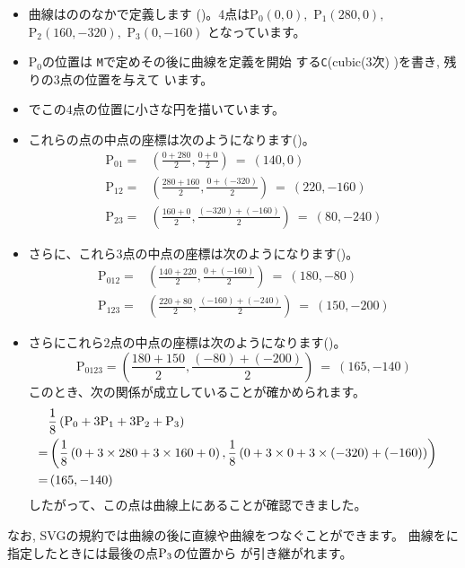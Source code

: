 \iffalse
なお、制御点をインターラクテイブに操作できるSVGの例が付録
\ref{svg-Bezier-interactive}
にありますので参考にしてください。
\fi
{}
\begin{itemize}
 \item \Bezier 曲線はののなかで定義します
       ()。4点は$
	\mathrm{P}_0(0,0),$ $\mathrm{P}_1(280,0),$ 
        $\mathrm{P}_2(160,-320),$ $\mathrm{P}_3(0,-160)
$%
 となっています。
 \item $\mathrm{P}_0$の位置は \texttt{M}で定めその後に\Bezier 曲線を定義を開始
       する\texttt{C}(cubic(3次) \Bezier )を書き, 残りの3点の位置を与えて
       います。
 \item {}でこの$4$点の位置に小さな円を描いています。
 \item これらの点の中点の座標は次のようになります()。
\begin{align*}
 \mathrm{P}_{01} =& \left(\frac{0+280}{2},\frac{0+0}{2}\right) \ =\ (140,0)\\
 \mathrm{P}_{12} =& \left(\frac{280+160}{2},\frac{0+(-320)}{2}\right)
   \ =\ (220,-160)\\
 \mathrm{P}_{23} =&
  \left(\frac{160+0}{2},\frac{(-320)+(-160)}{2}\right)
    \ =\ (80,-240)
\end{align*}
 \item さらに、これら$3$点の中点の座標は次のようになります()。
\begin{align*}
  \mathrm{P}_{012}=& \left(\frac{140+220}{2},\frac{0+(-160)}{2}\right)
     \ =\ (180,-80)\\
  \mathrm{P}_{123}=& \left(\frac{220+80}{2},\frac{(-160)+(-240)}{2}\right)
     \ =\ (150,-200)
\end{align*}
 \item さらにこれら$2$点の中点の座標は次のようになります()。
\[ 
  \mathrm{P}_{0123}
    = \left(\frac{180+150}{2},\frac{(-80)+(-200)}{2}\right)
     \ =\ (165,-140)
\]
このとき、次の関係が成立していることが確かめられます。
\begin{align*}
\lefteqn{ \frac{1}{8}\left(\mathrm{P}_0+ 3\mathrm{P}_1+3 \mathrm{P}_2+
       \mathrm{P}_3\right)}\\
=& \left(\frac{1}{8}\left(0 +3\times280+3\times160+0\right),
         \frac{1}{8}\left(0+3\times0+3\times(-320)+(-160)\right)\right)\\
=& \left(165,-140\right)
\end{align*}
したがって、この点は\Bezier 曲線上にあることが確認できました。
\end{itemize}
なお, SVGの規約では\Bezier 曲線の後に直線や曲線をつなぐことができます。
\Bezier 曲線をに指定したときには最後の点${\rm P}_3$の位置から
が引き継がれます。

